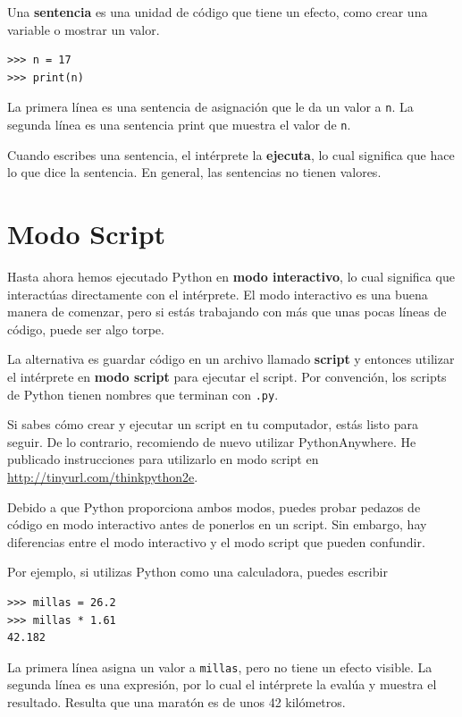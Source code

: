 \documentclass[10pt]{book}
\begin{document}
Una {\bf sentencia} es una unidad de código que tiene un efecto, como
crear una variable o mostrar un valor.

\begin{verbatim}
>>> n = 17
>>> print(n)
\end{verbatim}
%
La primera línea es una sentencia de asignación que le da un valor a
{\tt n}.  La segunda línea es una sentencia print que muestra el
valor de {\tt n}.

Cuando escribes una sentencia, el intérprete la {\bf ejecuta},
lo cual significa que hace lo que dice la sentencia.  En general,
las sentencias no tienen valores.


\section{Modo Script}

Hasta ahora hemos ejecutado Python en {\bf modo interactivo}, lo cual
significa que interactúas directamente con el intérprete.
El modo interactivo es una buena manera de comenzar,
pero si estás trabajando con más que unas pocas líneas de código, puede ser
algo torpe.

La alternativa es guardar código en un archivo llamado {\bf script} y
entonces utilizar el intérprete en {\bf modo script} para ejecutar el script.  Por
convención, los scripts de Python tienen nombres que terminan con {\tt .py}.

Si sabes cómo crear y ejecutar un script en tu computador, estás
listo para seguir.  De lo contrario, recomiendo de nuevo utilizar PythonAnywhere.
He publicado instrucciones para utilizarlo en modo script en
\url{http://tinyurl.com/thinkpython2e}.

Debido a que Python proporciona ambos modos,
puedes probar pedazos de código en modo interactivo antes de ponerlos
en un script.  Sin embargo, hay diferencias entre el modo interactivo
y el modo script que pueden confundir.

Por ejemplo, si utilizas Python como una calculadora, puedes escribir

\begin{verbatim}
>>> millas = 26.2
>>> millas * 1.61
42.182
\end{verbatim}

La primera línea asigna un valor a {\tt millas}, pero no tiene un efecto
visible.  La segunda línea es una expresión, por lo cual el
intérprete la evalúa y muestra el resultado.  Resulta que una
maratón es de unos 42 kilómetros.
\end{document}
